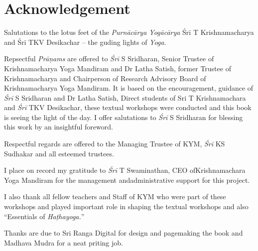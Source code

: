 \thispagestyle{empty}

\chapter*{Acknowledgement}\label{ack}

Salutations to the lotus feet of the \textit{Purnācārya Yogācārya} Śrī T Krishnamacharya and Śrī TKV Desikachar – the guding lights of \textit{Yoga}.

Repsectful \textit{Prāṇams} are offered to \textit{Śrī} S Sridharan, Senior Trustee of Krishnamacharya Yoga Mandiram and Dr Latha Satish, former Trustee of Krishnamacharya and Chairperson of Research Advisory Board of Krishnamacharya Yoga Mandiram. It is based on the encouragement, guidance of \textit{Śrī} S Sridharan and Dr Latha Satish, Direct students of Sri T Krishnamachara and \textit{Śrī} TKV Desikachar, these textual workshops were conducted and this book is seeing the light of the day. I offer salutations to \textit{Śrī} S Sridharan for blessing this work by an insightful foreword. 

Respectful regards are offered to the Managing Trustee of KYM, \textit{Śrī} KS Sudhakar and all esteemed trustees. 

I place on record my gratitude to \textit{Śrī} T Swaminathan, CEO of\break Krishnamachara Yoga Mandiram for the management and\break administrative support for this project. 

I also thank all fellow teachers and Staff of KYM who were part of these workshops and played important role in shaping the textual workshops and also “Essentials of \textit{Haṭhayoga.}”

Thanks are due to Sri Ranga Digital for design and pagemaking the book and Madhava Mudra for a neat priting job.

